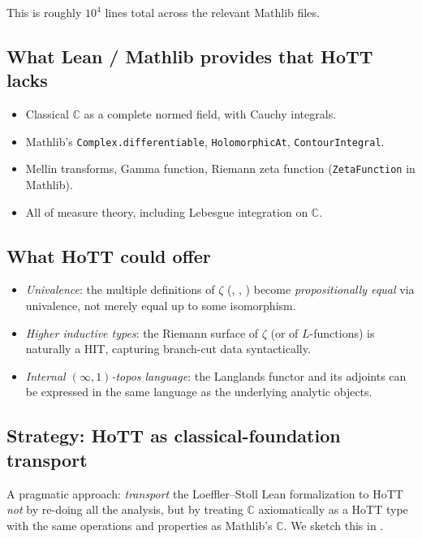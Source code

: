 \documentclass[12pt]{article}
\theoremstyle{definition}
\theoremstyle{remark}
\newcommand{\C}{\mathbb{C}}
\begin{document}
This is roughly $10^4$ lines total across the relevant Mathlib files.

\subsection{What Lean / Mathlib provides that HoTT lacks}

\begin{itemize}
\item Classical $\C$ as a complete normed field, with Cauchy integrals.
\item Mathlib's \texttt{Complex.differentiable}, \texttt{HolomorphicAt},
\texttt{ContourIntegral}.
\item Mellin transforms, Gamma function, Riemann zeta function
(\texttt{ZetaFunction} in Mathlib).
\item All of measure theory, including Lebesgue integration on $\C$.
\end{itemize}

\subsection{What HoTT could offer}

\begin{itemize}
\item \emph{Univalence}: the multiple definitions of $\zeta$
(, , ) become
\emph{propositionally equal} via univalence, not merely equal up to
some isomorphism.
\item \emph{Higher inductive types}: the Riemann surface of $\zeta$ (or of
$L$-functions) is naturally a HIT, capturing branch-cut data
syntactically.
\item \emph{Internal $(\infty,1)$-topos language}: the Langlands functor and
its adjoints can be expressed in the same language as the underlying
analytic objects.
\end{itemize}

\subsection{Strategy: HoTT as classical-foundation transport}

A pragmatic approach: \emph{transport} the Loeffler--Stoll Lean
formalization to HoTT \emph{not} by re-doing all the analysis, but by
treating $\C$ axiomatically as a HoTT type with the same operations and
properties as Mathlib's $\C$. We sketch this in .
\end{document}
